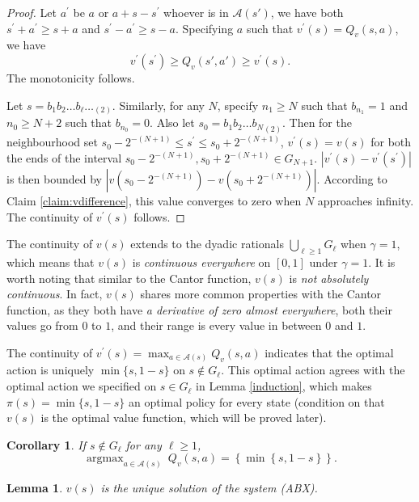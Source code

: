 \documentclass{article}
\newtheorem{lemma}[theorem]{Lemma}
\newtheorem{corollary}[theorem]{Corollary}
\theoremstyle{named}
\DeclareMathOperator*{\argmax}{arg max}
\newcommand{\cA}{\mathcal{A}}
\newcommand{\set}[1]{\left\{#1\right\}}
\begin{document}
\begin{proof}
Let $a^\prime$ be $a$ or $a+s-s^\prime$ whoever is in $\cA(s')$, we have both $s^\prime+a^\prime\geq s+a$ and $s^\prime-a^\prime\geq s-a$. Specifying $a$ such that $v^\prime(s)=Q_v(s,a)$, we have
\[
v^\prime(s^\prime)\geq Q_v(s',a')\geq v^\prime(s).
\]
The monotonicity follows. 

Let $s=b_1b_2\dots b_\ell\dots_{(2)}$. Similarly, for any $N$, specify $n_1\geq N$ such that $b_{n_1}=1$ and $n_0\geq N+2$ such that $b_{n_0}=0$. Also let $s_0={b_1b_2\dots b_{N}}_{(2)}$. Then for the neighbourhood set $s_0-2^{-(N+1)}\leq s^\prime\leq s_0+2^{-(N+1)}$, $v^\prime(s)=v(s)$ for both the ends of the interval $s_0-2^{-(N+1)},s_0+2^{-(N+1)}\in G_{N+1}$. $|v^\prime(s)-v^\prime(s^\prime)|$ is then bounded by $|v(s_0-2^{-(N+1)})-v(s_0+2^{-(N+1)})|$. According to Claim \ref{claim:vdifference}, this value converges to zero when $N$ approaches infinity. The continuity of $v^\prime(s)$ follows.
\end{proof}

The continuity of $v(s)$ extends to the dyadic rationals $\bigcup_{\ell\geq 1} G_\ell$ when $\gamma=1$, which means that $v(s)$ is \textit{continuous everywhere} on $[0,1]$ under $\gamma=1$. It is worth noting that similar to the Cantor function, $v(s)$ is \textit{not absolutely continuous}. In fact, $v(s)$ shares more common properties with the Cantor function, as they both have \textit{a derivative of zero almost everywhere}, both their values go from $0$ to $1$, and their range is every value in between $0$ and $1$.

The continuity of $v^\prime(s)=\max_{a\in\cA(s)} Q_v(s,a)$ indicates that the optimal action is uniquely $\min\{s,1-s\}$ on $s\notin G_\ell$. This optimal action agrees with the optimal action we specified on $s\in G_\ell$ in Lemma \ref{induction}, which makes $\pi(s)=\min\{s,1-s\}$ an optimal policy for every state (condition on that $v(s)$ is the optimal value function, which will be proved later).

\begin{corollary}
\label{thm:policyirrational}
If $s\notin G_{\ell}$ for any $\ell\geq 1$, 
\[
\argmax_{a\in \cA(s)}\ Q_v(s,a) = \set{\min\set{s,1-s}}.
\]
\end{corollary}

\begin{lemma}
\label{uniquegambler}
$v(s)$ is the unique solution of the system ({ABX}).
\end{lemma}
\end{document}
